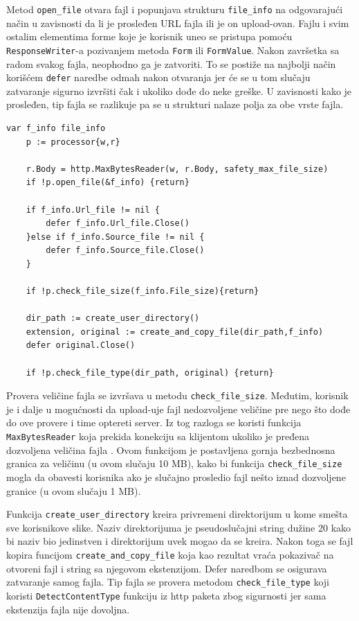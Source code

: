 \documentclass[12pt,oneside]{memoir}
\begin{document}
Metod \texttt{open\_file} otvara fajl i popunjava strukturu \texttt{file\_info} na odgovarajući način u zavisnosti da li je prosleđen URL fajla ili je on upload-ovan. Fajlu i svim ostalim elementima forme koje je korisnik uneo se pristupa pomoću \texttt{ResponseWriter}-a pozivanjem metoda \texttt{Form} ili \texttt{FormValue}. Nakon završetka sa radom svakog fajla, neophodno ga je zatvoriti. To se postiže na najbolji način korišćem \texttt{defer} naredbe odmah nakon otvaranja jer će se u tom slučaju zatvaranje sigurno izvršiti čak i ukoliko dođe do neke greške. U zavisnosti kako je prosleđen, tip fajla se razlikuje pa se u strukturi nalaze polja za obe vrste fajla. 


\begin{center}
\begin{lstlisting}[caption=Otvaranje i provera fajla u funkciji ImageHandler,label={lst:open},float,  backgroundcolor=\color{background}]
	var f_info file_info
	p := processor{w,r}

	r.Body = http.MaxBytesReader(w, r.Body, safety_max_file_size)
	if !p.open_file(&f_info) {return}

	if f_info.Url_file != nil {
		defer f_info.Url_file.Close()
	}else if f_info.Source_file != nil {
		defer f_info.Source_file.Close()
	}

	if !p.check_file_size(f_info.File_size){return}

	dir_path := create_user_directory()
	extension, original := create_and_copy_file(dir_path,f_info)
	defer original.Close()

	if !p.check_file_type(dir_path, original) {return}
\end{lstlisting}
\end{center}

Provera veličine fajla se izvršava u metodu \texttt{check\_file\_size}. Međutim, korisnik je i dalje u mogućnosti da upload-uje fajl nedozvoljene veličine pre nego što dođe do ove provere i time optereti server. Iz tog razloga se koristi funkcija \texttt{MaxBytesReader} koja prekida konekciju sa klijentom ukoliko je pređena dozvoljena veličina fajla \cite{http}. Ovom funkcijom je postavljena gornja bezbednosna granica za veličinu (u ovom slučaju 10 MB), kako bi funkcija \texttt{check\_file\_size} mogla da obavesti korisnika ako je slučajno prosledio fajl nešto iznad dozvoljene granice (u ovom slučaju 1 MB). 

Funkcija \texttt{create\_user\_directory} kreira privremeni direktorijum u kome smešta sve korisnikove slike. Naziv direktorijuma je pseudoslučajni string dužine 20 kako bi naziv bio jedinstven i direktorijum uvek mogao da se kreira. Nakon toga se fajl kopira funcijom \texttt{create\_and\_copy\_file} koja kao rezultat vraća pokazivač na otvoreni fajl i string sa njegovom ekstenzijom. Defer naredbom se osigurava zatvaranje samog fajla. Tip fajla se provera metodom  \texttt{check\_file\_type} koji koristi \texttt{DetectContentType} funkciju iz http paketa zbog sigurnosti jer sama ekstenzija fajla nije dovoljna.
 
\end{document}
